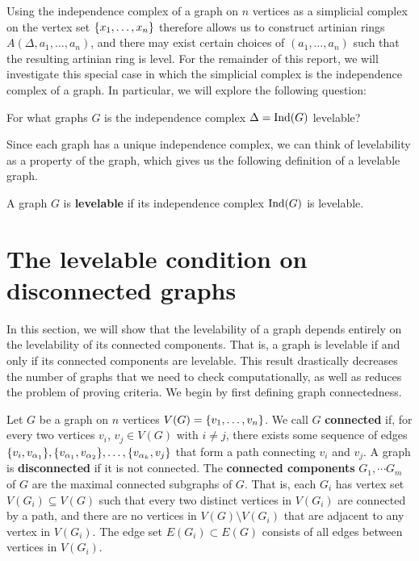 Using the independence complex of a graph on $n$ vertices as a simplicial complex on the vertex set $\{ x_1, \dots, x_n \}$ therefore allows us to construct artinian rings $A(\Delta, a_1, \dots, a_n)$, and there may exist certain choices of $(a_1, \dots, a_n)$ such that the resulting artinian ring is level. For the remainder of this report, we will investigate this special case in which the simplicial complex is the independence complex of a graph. In particular, we will explore the following question:

\begin{question*}
For what graphs $G$ is the independence complex $\Delta = \textrm{Ind} (G)$ levelable?
\end{question*}

Since each graph has a unique independence complex, we can think of levelability as a property of the graph, which gives us the following definition of a levelable graph.

\begin{definition}
A graph $G$ is \textbf{levelable} if its independence complex $\textrm{Ind}(G)$ is levelable. 
\end{definition}


\section{The levelable condition on disconnected graphs} \label{sec:disconnected}

In this section, we will show that the levelability of a graph depends entirely on the levelability of its connected components. That is, a graph is levelable if and only if its connected components are levelable.  This result drastically decreases the number of graphs that we need to check computationally, as well as reduces the problem of proving criteria. We begin by first defining graph connectedness.

\begin{definition}
Let $G$ be a graph on $n$ vertices $V(G) = \{ v_1, \dots, v_n \}$. We call $G$ \textbf{connected} if, for every two vertices $v_i$, $v_j \in V(G)$ with $i \neq j$, there exists some sequence of edges $\{ v_i, v_{\alpha_1} \}, \{ v_{\alpha_1}, v_{\alpha_2} \}, \dots, \{ v_{\alpha_k}, v_j \}$ that form a path connecting $v_i$ and $v_j$. A graph is \textbf{disconnected} if it is not connected. The \textbf{connected components} $G_1, \cdots G_m$ of $G$ are the maximal connected subgraphs of $G$. That is, each $G_i$ has vertex set $V(G_i) \subseteq V(G)$ such that every two distinct vertices in $V(G_i)$ are connected by a path, and there are no vertices in $V(G) \setminus V(G_i)$ that are adjacent to any vertex in $V(G_i)$. The edge set $E(G_i) \subset E(G)$ consists of all edges between vertices in $V(G_i)$.
\end{definition}

